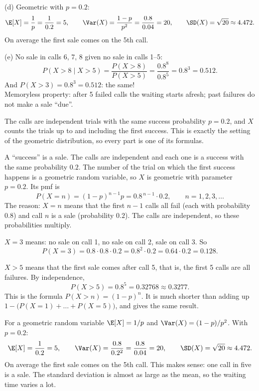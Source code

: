 \begin{slides}
	\small
	(d) Geometric with $p=0.2$:
	\[ \E[X]=\frac1p=\frac1{0.2}=5,\qquad
		\Var(X)=\frac{1-p}{p^2}=\frac{0.8}{0.04}=20,\qquad
		\SD(X)=\sqrt{20}\approx4.472. \]
	On average the first sale comes on the 5th call.
	\pause
	\medskip

	(e) No sale in calls 6, 7, 8 given no sale in calls 1--5:
	\[ P(X>8\mid X>5)=\frac{P(X>8)}{P(X>5)}
		=\frac{0.8^8}{0.8^5}=0.8^3=0.512. \]
	\pause
	And $P(X>3)=0.8^3=0.512$: the same!\\[1mm]
	\alert{Memoryless property:} after 5 failed calls the waiting starts
	afresh; past failures do not make a sale ``due''.
\end{slides}

\begin{solution}
	\idea The calls are independent trials with the same success probability
	$p=0.2$, and $X$ counts the trials up to and including the first success.
	This is exactly the setting of the geometric distribution, so every part is
	one of its formulas.

	 A ``success'' is a sale. The calls are independent and each one
	is a success with the same probability $0.2$. The number of the trial on
	which the first success happens is a geometric random variable, so $X$ is
	geometric with parameter $p=0.2$. Its pmf is
	\[ P(X=n)=(1-p)^{n-1}p=0.8^{\,n-1}\cdot0.2,\qquad n=1,2,3,\dots \]
	The reason: $X=n$ means that the first $n-1$ calls all fail (each with
	probability $0.8$) and call $n$ is a sale (probability $0.2$). The calls
	are independent, so these probabilities multiply.

	 $X=3$ means: no sale on call 1, no sale on call 2, sale on
	call 3. So
	\[ P(X=3)=0.8\cdot0.8\cdot0.2=0.8^2\cdot0.2=0.64\cdot0.2=0.128. \]

	 $X>5$ means that the first sale comes after call 5, that is,
	the first 5 calls are all failures. By independence,
	\[ P(X>5)=0.8^5=0.32768\approx0.3277. \]
	This is the formula $P(X>n)=(1-p)^n$. It is much shorter than adding up
	$1-\bigl(P(X=1)+\dots+P(X=5)\bigr)$, and gives the same result.

	 For a geometric random variable $\E[X]=1/p$ and
	$\Var(X)=(1-p)/p^2$. With $p=0.2$:
	\[ \E[X]=\frac{1}{0.2}=5,\qquad
		\Var(X)=\frac{0.8}{0.2^2}=\frac{0.8}{0.04}=20,\qquad
		\SD(X)=\sqrt{20}\approx4.472. \]
	On average the first sale comes on the 5th call. This makes sense: one call
	in five is a sale. The standard deviation is almost as large as the mean,
	so the waiting time varies a lot.


\end{solution}
